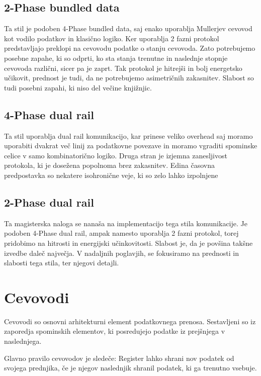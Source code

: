 \subsection{2-Phase bundled data} \label{b}
Ta stil je podoben 4-Phase bundled data, saj enako uporablja Mullerjev cevovod kot vodilo podatkov in klasično logiko. Ker uporablja 2 fazni protokol predstavljajo preklopi na cevovodu podatke o stanju cevovoda. Zato potrebujemo posebne zapahe, ki so odprti, ko sta stanja trenutne in naslednje stopnje cevovoda različni, sicer pa je zaprt. Tak protokol je hitrejši in bolj energetsko učikovit, prednost je tudi, da ne potrebujemo asimetričnih zakasnitev. Slabost so tudi posebni zapahi, ki niso del večine knjižnjic.

\subsection{4-Phase dual rail} \label{b}
Ta stil uporablja dual rail komunikacijo, kar prinese veliko overhead saj moramo uporabiti dvakrat več linij za podatkovne povezave in moramo vgraditi spominske celice v samo kombinatorično logiko. Druga stran je izjemna zanesljivost protokola, ki je dosežena popolnoma brez zakasnitev. Edina časovna predpostavka so nekatere isohronične veje, ki so zelo lahko izpolnjene

\subsection{2-Phase dual rail} \label{b}
Ta magisterska naloga se nanaša na implementacijo tega stila komunikacije. Je podoben 4-Phase dual rail, ampak namesto uporablja 2 fazni protokol, torej pridobimo na hitrosti in energijski učinkovitosti. Slabost je, da je povšina takšne izvedbe daleč največja. V nadaljnih poglavjih, se fokusiramo na prednosti in slabosti tega stila, ter njegovi detajli.




\section{Cevovodi} \label{a}

Cevovodi so osnovni arhitekturni element podatkovnega prenosa. Sestavljeni so iz zaporedja spominskih elementov, ki posredujejo podatke iz prejšnjega v naslednjega.

Glavno pravilo cevovodov je sledeče:
Register lahko shrani nov podatek od svojega prednjika, če je njegov naslednjik shranil podatek, ki ga trenutno vsebuje.


